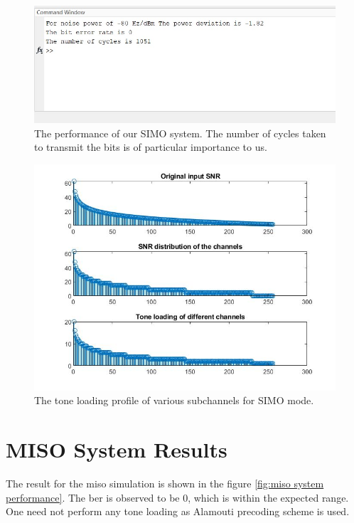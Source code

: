 \begin{figure}[!htbp]
\centering
\includegraphics[scale=1]{Chapter 4/Figures/SIMO System Performance}
\caption[SIMO Tone Loading]{The performance of our SIMO system. The number of cycles taken to transmit the bits is of particular importance to us.}
\label{fig:simo system performance}
\end{figure}

\begin{figure}[!htbp]
\centering
\includegraphics[scale=0.7]{Chapter 4/Figures/SIMO Tone Loading}
\caption[SIMO Tone Loading]{The tone loading profile of various subchannels for SIMO mode.}
\label{fig:simo tone loading}
\end{figure}

\section{MISO System Results}
The result for the \acrshort{miso} simulation is shown in the figure \ref{fig:miso system performance}. The \acrshort{ber} is observed to be $0$, which is within the expected range. One need not perform any tone loading as Alamouti precoding scheme is used. 

